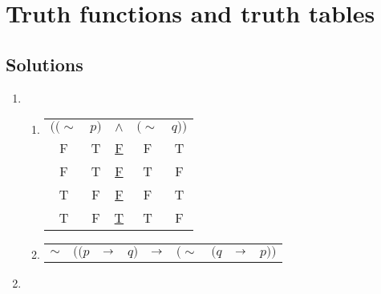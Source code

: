 \section{Truth functions and truth tables}

\subsection*{Solutions}

\begin{enumerate}
  \item %
    \begin{enumerate}[(\alph*)]
      \item 
        \begin{tabular}{| ccccc |}
          \(((\sim\)&
          \(p)\)&
          \(\wedge\)&
          \((\sim\)&
          \(q))\)\\

          F&
          T&
          \underline{F}&
          F&
          T\\

          F&
          T&
          \underline{F}&
          T&
          F\\

          T&
          F&
          \underline{F}&
          F&
          T\\

          T&
          F&
          \underline{T}&
          T&
          F
        \end{tabular}

        \item
          \begin{tabular}{| ccccccccc |}
            \(\sim\)&
            \(((p\)&
            \(\rightarrow\)&
            \(q)\)&
            \(\rightarrow\)&
            \((\sim\)&
            \((q\)&
            \(\rightarrow\)&
            \(p))\)\\
          \end{tabular}
    \end{enumerate}

  \item %
\end{enumerate}

